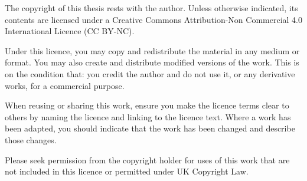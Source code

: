 
\begin{Copyright Declaration}

The copyright of this thesis rests with the author. Unless otherwise indicated,
its contents are licensed under a Creative Commons Attribution-Non
Commercial 4.0 International Licence (CC BY-NC).

Under this licence, you may copy and redistribute the material in any medium
or format. You may also create and distribute modified versions of the work.
This is on the condition that: you credit the author and do not use it, or any
derivative works, for a commercial purpose.

When reusing or sharing this work, ensure you make the licence terms clear to
others by naming the licence and linking to the licence text. Where a work has
been adapted, you should indicate that the work has been changed and
describe those changes.

Please seek permission from the copyright holder for uses of this work that are
not included in this licence or permitted under UK Copyright Law.

\end{Copyright Declaration}

